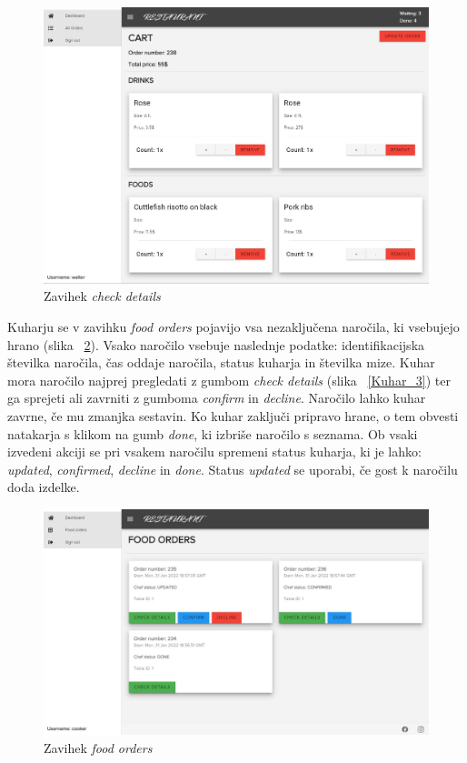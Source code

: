 \documentclass[a4paper, 12pt]{book}
\begin{document}
\begin{figure}[!htb]
\begin{center}
\includegraphics[width=13.7cm]{waiter_2.jpg}
\caption{Zavihek \textit{check details}}
\label{Natakar_3}
\end{center}
\end{figure}

Kuharju se v zavihku \textit{food orders} pojavijo vsa nezaključena naročila, ki vsebujejo hrano (slika ~\ref{Kuhar_4}). Vsako naročilo vsebuje naslednje podatke: identifikacijska številka naročila, čas oddaje naročila, status kuharja in številka mize. Kuhar mora naročilo najprej pregledati z gumbom \textit{check details} (slika  ~\ref{Kuhar_3}) ter ga sprejeti ali zavrniti z gumboma \textit{confirm} in \textit{decline}. Naročilo lahko kuhar zavrne, če mu zmanjka sestavin. Ko kuhar zaključi pripravo hrane, o tem obvesti natakarja s klikom na gumb \textit{done}, ki izbriše naročilo s seznama. Ob vsaki izvedeni akciji se pri vsakem naročilu spremeni status kuharja, ki je lahko: \textit{updated}, \textit{confirmed}, \textit{decline} in \textit{done}. Status \textit{updated} se uporabi, če gost k naročilu doda izdelke.

\begin{figure}[!htb]
\centering
\includegraphics[width=13.7cm]{cooker_1.jpg}
\caption{Zavihek \textit{food orders}}
\label{Kuhar_4}
\end{figure}
\end{document}
